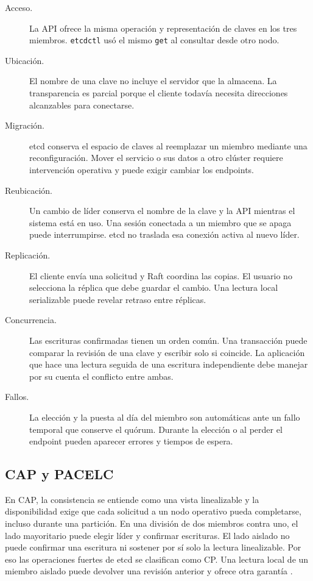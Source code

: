 \documentclass[11pt,a4paper]{article}
\begin{document}
\begin{description}
\item[Acceso.] La API ofrece la misma operación y representación de claves en los tres miembros. \texttt{etcdctl} usó el mismo \texttt{get} al consultar desde otro nodo.
\item[Ubicación.] El nombre de una clave no incluye el servidor que la almacena. La transparencia es parcial porque el cliente todavía necesita direcciones alcanzables para conectarse.
\item[Migración.] etcd conserva el espacio de claves al reemplazar un miembro mediante una reconfiguración. Mover el servicio o sus datos a otro clúster requiere intervención operativa y puede exigir cambiar los endpoints.
\item[Reubicación.] Un cambio de líder conserva el nombre de la clave y la API mientras el sistema está en uso. Una sesión conectada a un miembro que se apaga puede interrumpirse. etcd no traslada esa conexión activa al nuevo líder.
\item[Replicación.] El cliente envía una solicitud y Raft coordina las copias. El usuario no selecciona la réplica que debe guardar el cambio. Una lectura local serializable puede revelar retraso entre réplicas.
\item[Concurrencia.] Las escrituras confirmadas tienen un orden común. Una transacción puede comparar la revisión de una clave y escribir solo si coincide. La aplicación que hace una lectura seguida de una escritura independiente debe manejar por su cuenta el conflicto entre ambas.
\item[Fallos.] La elección y la puesta al día del miembro son automáticas ante un fallo temporal que conserve el quórum. Durante la elección o al perder el endpoint pueden aparecer errores y tiempos de espera.
\end{description}

\subsection{CAP y PACELC}
En CAP, la consistencia se entiende como una vista linealizable y la disponibilidad exige que cada solicitud a un nodo operativo pueda completarse, incluso durante una partición. En una división de dos miembros contra uno, el lado mayoritario puede elegir líder y confirmar escrituras. El lado aislado no puede confirmar una escritura ni sostener por sí solo la lectura linealizable. Por eso las operaciones fuertes de etcd se clasifican como CP. Una lectura local de un miembro aislado puede devolver una revisión anterior y ofrece otra garantía \cite{vansteen2023,etcdgar,etcdfail}.
\end{document}
